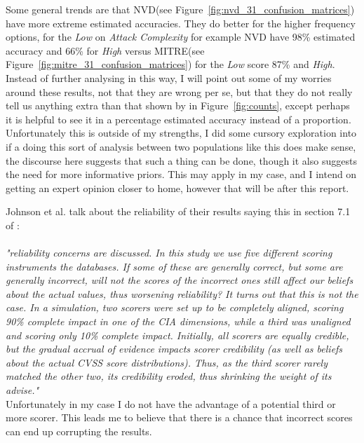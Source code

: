 \documentclass[12pt]{article}
\begin{document}
Some general trends are that NVD(see Figure~\ref{fig:nvd_31_confusion_matrices}) have more extreme
estimated accuracies. They do better for the higher frequency options, for the \emph{Low} on
\emph{Attack Complexity} for example NVD have 98\% estimated accuracy and 66\% for \emph{High}
versus MITRE(see Figure~\ref{fig:mitre_31_confusion_matrices}) for the \emph{Low} score 87\% and
\emph{High}. Instead of further analysing in this way, I will point out some of my worries around
these results, not that they are wrong per se, but that they do not really tell us anything extra
than that shown by in Figure~\ref{fig:counts}, except perhaps it is helpful to see it in a
percentage estimated accuracy instead of a proportion. Unfortunately this is outside of my
strengths, I did some cursory exploration into if a doing this sort of analysis between two
populations like this does make sense, the discourse here  \cite{stat_modeling} suggests that such a
thing can be done, though it also suggests the need for more informative priors. This may apply in
my case, and I intend on getting an expert opinion closer to home, however that will be after this
report.

Johnson et al. talk about the reliability of their results saying this in section 7.1 of \cite{bayes}:\\ \\

\textit{"reliability concerns
	are discussed. In this study we use five different scoring instruments the databases. If some of
	these are generally correct, but some are generally incorrect, will not the scores of the
	incorrect ones still affect our beliefs about the actual values, thus worsening reliability? It
	turns out that this is not the case. In a simulation, two scorers were set up to be completely
	aligned, scoring 90\% complete impact in one of the CIA dimensions, while a third was unaligned
	and scoring only 10\% complete impact. Initially, all scorers are equally credible, but the
	gradual accrual of evidence impacts scorer credibility (as well as beliefs about the actual CVSS
	score distributions). Thus, as the third scorer rarely matched the other two, its credibility
	eroded, thus shrinking the weight of its advise."} \cite{bayes}\\

Unfortunately in my case I do not have the advantage of a potential third or more scorer. This leads
me to believe that there is a chance that incorrect scores can end up corrupting the results.
\end{document}
